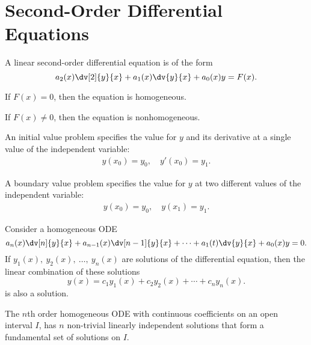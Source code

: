 \documentclass{article}
\begin{document}
\section{Second-Order Differential Equations}
A linear second-order differential equation is of the form 
\begin{equation*}
    a_2(x)\dv[2]{y}{x}+ a_1(x)\dv{y}{x} + a_0(x)y = F(x). 
\end{equation*}
\begin{description}
    \item If $F(x) = 0$, then the equation is homogeneous.
    \item If $F(x) \neq 0$, then the equation is nonhomogeneous.
\end{description}
\begin{definition}
    An initial value problem specifies the value for $y$ and its derivative at a single value of the independent variable:
    \begin{align*}
        y(x_0) = y_0, \quad y'(x_0) = y_1.
    \end{align*}
\end{definition}
\begin{definition}
    A boundary value problem specifies the value for $y$ at two different values of the independent variable:
    \begin{align*}
        y(x_0) = y_0, \quad y(x_1) = y_1.
    \end{align*}
\end{definition}
\begin{theorem}
    Consider a homogeneous ODE
    \begin{equation*}
        a_n(x)\dv[n]{y}{x} + a_{n-1}(x)\dv[n-1]{y}{x} + \cdots + a_1(t)\dv{y}{x} + a_0(x)y = 0.
    \end{equation*}
    If $y_1(x),\: y_2(x),\: \dots ,\: y_n(x)$ are solutions of the differential equation, then 
    the linear combination of these solutions
    \begin{equation*}
        y(x) = c_1 y_1(x) + c_2 y_2(x) + \cdots + c_n y_n(x).
    \end{equation*}
    is also a solution.
\end{theorem}
\begin{theorem}
    The $n$th order homogeneous ODE with continuous coefficients on an open interval $I$,
    has $n$ non-trivial linearly independent solutions that form
    a fundamental set of solutions on $I$. 
\end{theorem}
\end{document}
